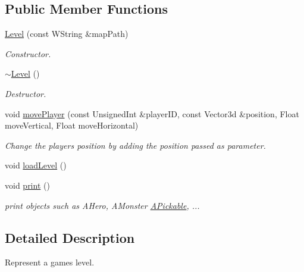 \subsection*{Public Member Functions}
\begin{DoxyCompactItemize}
\item 
\mbox{\label{classLevel_a449da6ec6c9863a35c94d2fcb2755433}} 
\hyperlink{classLevel_a449da6ec6c9863a35c94d2fcb2755433}{Level} (const W\+String \&map\+Path)
\begin{DoxyCompactList}\small\item\em Constructor. \end{DoxyCompactList}\item 
\mbox{\label{classLevel_a249eac1e8f19ff44134efa5e986feaca}} 
\hyperlink{classLevel_a249eac1e8f19ff44134efa5e986feaca}{$\sim$\+Level} ()
\begin{DoxyCompactList}\small\item\em Destructor. \end{DoxyCompactList}\item 
void \hyperlink{classLevel_a11e0cf9684245fb8ed9b880f7924b38a}{move\+Player} (const Unsigned\+Int \&player\+ID, const Vector3d \&position, Float move\+Vertical, Float move\+Horizontal)
\begin{DoxyCompactList}\small\item\em Change the player\textquotesingle{}s position by adding the position passed as parameter. \end{DoxyCompactList}\item 
void \hyperlink{classLevel_aa88db36cd824320cb599d913603dc2a3}{load\+Level} ()
\item 
\mbox{\label{classLevel_a5188de55912386ca786cdbe093ca2af4}} 
void \hyperlink{classLevel_a5188de55912386ca786cdbe093ca2af4}{print} ()
\begin{DoxyCompactList}\small\item\em print objects such as A\+Hero, A\+Monster \hyperlink{classAPickable}{A\+Pickable}, ... \end{DoxyCompactList}\end{DoxyCompactItemize}


\subsection{Detailed Description}
Represent a game\textquotesingle{}s level. 

